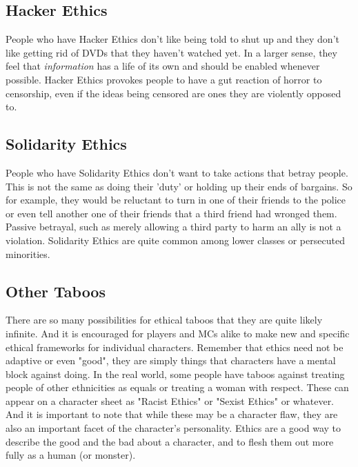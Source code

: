 \subsection{Hacker Ethics}

People who have Hacker Ethics don't like being told to shut up and they don't like getting rid of DVDs that they haven't watched yet. In a larger sense, they feel that \textit{information} has a life of its own and  should be enabled whenever possible. Hacker Ethics provokes people to have a gut reaction of horror to censorship, even if the ideas being censored are ones they are violently opposed to. 

\subsection{Solidarity Ethics}

People who have Solidarity Ethics don't want to take actions that betray people. This is not the same as doing their 'duty' or holding up their ends of bargains. So for example, they would be reluctant to turn in one of their friends to the police or even tell another one of their friends that a third friend had wronged them. Passive betrayal, such as merely allowing a third party to harm an ally is not a violation. Solidarity Ethics are quite common among lower classes or persecuted minorities. 

\subsection{Other Taboos}

There are so many possibilities for ethical taboos that they are quite likely infinite. And it is encouraged for players and MCs alike to make new and specific ethical frameworks for individual characters. Remember that ethics need not be adaptive or even "good", they are simply things that characters have a mental block against doing. In the real world, some people have taboos against treating people of other ethnicities as equals or treating a woman with respect. These can appear on a character sheet as "Racist Ethics" or "Sexist Ethics" or whatever. And it is important to note that while these may be a character flaw, they are also an important facet of the character's personality. Ethics are a good way to describe the good and the bad about a character, and to flesh them out more fully as a human (or monster).

